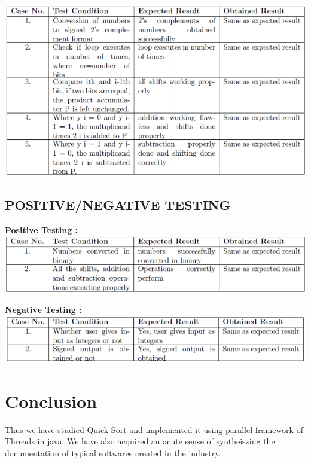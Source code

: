 \documentclass[10pt,a4paper]{article}
\begin{document}
\includegraphics[width=\textwidth]{booth_whitebox}

\subsection{ POSITIVE/NEGATIVE TESTING }

\textbf{Positive Testing :}\\
\includegraphics[width=\textwidth]{booth_positive}
\vspace{30px}

\textbf{Negative Testing :}\\
\includegraphics[width=\textwidth]{booth_negative}
\vspace{30px}

\section{Conclusion}
Thus we have studied Quick Sort and implemented it using parallel framework of Threads in java. We have also acquired an acute sense of syntheiszing the documentation of typical softwares created in the industry.
\end{document}
